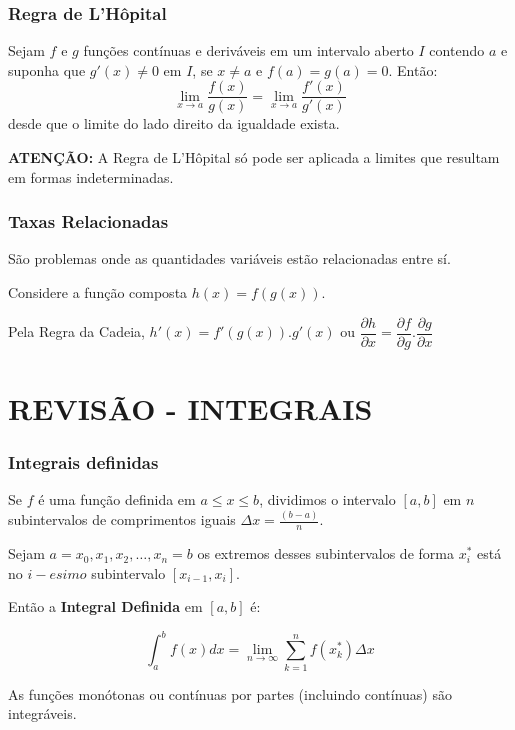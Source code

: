 \documentclass[hyperref={pdfpagelabels=false}]{beamer}
\begin{document}
\begin{frame}
\frametitle{Regra de L'Hôpital}

Sejam $f$ e $g$ funções contínuas e deriváveis em um intervalo aberto $I$ contendo $a$ e suponha que $g'(x) \neq 0$ em $I$, se $x \neq a$ e $f(a) = g(a) = 0$. Então:
$$\lim\limits_{x \rightarrow a}\frac{f(x)}{g(x)} = \lim\limits_{x \rightarrow a}\frac{f'(x)}{g'(x)}$$
desde que o limite do lado direito da igualdade exista.

\pause

{\bf ATENÇÃO:} A Regra de L'Hôpital só pode ser aplicada a limites que resultam em formas indeterminadas.


\end{frame}


\begin{frame}
\frametitle{Taxas Relacionadas}
São problemas onde as quantidades variáveis estão relacionadas entre sí.

Considere a função composta $h(x) = f(g(x))$.

Pela Regra da Cadeia, $h'(x) = f'(g(x)).g'(x)$ ou $\dfrac{\partial h}{\partial x} = \dfrac{\partial f}{\partial g} . \dfrac{\partial g}{\partial x}$

\end{frame}

\section{REVISÃO - INTEGRAIS}
\begin{frame}
\frametitle{Integrais definidas}

\begin{definition}
	Se $f$ é uma função definida em $a \leq x \leq b$, dividimos o intervalo $[a,b]$ em $n$ subintervalos de comprimentos iguais $\Delta x = \frac{(b-a)}{n}$.
	
	Sejam $a = x_0, x_1, x_2, \dots, x_n = b$ os extremos desses subintervalos de forma $x^{*}_i$ está no $i-esimo$ subintervalo $[x_{i-1},x_i]$.
	
	Então a {\bf Integral Definida} em $[a,b]$ é:
	
	$$\int_{a}^{b}f(x)dx = \lim\limits_{n \rightarrow \infty}\sum_{k=1}^{n}f(x_{k}^{*})\Delta x$$
\end{definition}
\pause

As funções monótonas ou contínuas por partes (incluindo contínuas) são integráveis.

\end{frame}
\end{document}
